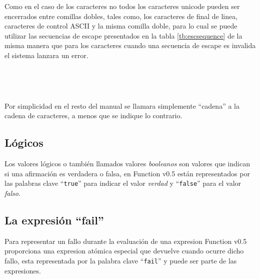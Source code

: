       \begin{fxcode}
      \end{fxcode}
      
      Como en el caso de los caracteres no todos los caracteres unicode pueden ser encerrados entre comillas dobles, tales como, los caracteres de final de linea, caracteres de control ASCII y la misma comilla doble, para lo cual se puede utilizar las secuencias de escape presentados en la tabla \ref{tb:escsequence} de la misma manera que para los caracteres cuando una secuencia de escape es invalida el sistema lanzara un error.
      
      \begin{fxcode}
         \\
      \end{fxcode}
      
      \begin{fxcode}
         \\
         \outcode{[]} 
      \end{fxcode}
      
      Por simplicidad en el resto del manual se llamara simplemente ``cadena'' a la cadena de caracteres, a menos que se indique lo contrario.
      
      \subsection{Lógicos}
      Los valores lógicos o también llamados valores \textit{booleanos} son valores que indican si una afirmación es verdadera o falsa, en Function v0.5 están representados por las palabras clave ``\texttt{true}'' para indicar el valor \textit{verdad} y ``\texttt{false}'' para el valor \textit{falso}.
      
      \begin{fxcode}
      \end{fxcode}
      
      \begin{fxcode}
      \end{fxcode}
      
      \subsection{La expresión ``fail''}
      Para representar un fallo durante la evaluación de una expresion Function v0.5 proporciona una expresion atómica especial que devuelve cuando ocurre dicho fallo, esta representada por la palabra clave ``\texttt{fail}'' y puede ser parte de las expresiones.
      
